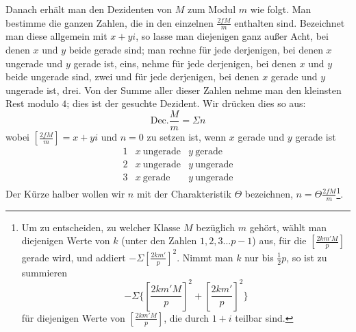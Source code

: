 Danach erhält man den Dezidenten von $M$ zum Modul $m$ wie folgt. Man bestimme die ganzen Zahlen, die in den einzelnen $\frac{2fM}{m}$ enthalten sind. Bezeichnet man diese allgemein mit $x+yi$, so lasse man diejenigen ganz außer Acht, bei denen $x$ und $y$ beide gerade sind; man rechne für jede derjenigen, bei denen $x$ ungerade und $y$ gerade ist, eins, nehme für jede derjenigen, bei denen $x$ und $y$ beide ungerade sind, zwei und für jede derjenigen, bei denen $x$ gerade und $y$ ungerade ist, drei. Von der Summe aller dieser Zahlen nehme man den kleinsten Rest modulo $4$; dies ist der gesuchte Dezident. Wir drücken dies so aus:
\[
\mathrm{Dec.}\frac{M}{m}=\Sigma n
\]
wobei $[\frac{2fM}{m}]=x+yi$ und $n=0$ zu setzen ist, wenn $x$ gerade und $y$ gerade ist
\[
\begin{array}{cll}
1&x\ \text{ungerade}&y\ \text{gerade}\\
2&x\ \text{ungerade}&y\ \text{ungerade}\\
3&x\ \text{gerade}&y\ \text{ungerade}
\end{array}
\]
Der Kürze halber wollen wir $n$ mit der Charakteristik $\Theta$ bezeichnen, \mbox{$n=\Theta\frac{2fM}{m}$}\begingroup\renewcommand{\thefootnote}{*)}\footnote{Um zu entscheiden, zu welcher Klasse $M$ bezüglich $m$ gehört, wählt man diejenigen Werte von $k$ (unter den Zahlen $1,2,3\ldots p-1$) aus, für die $[\frac{2km'M}{p}]$ gerade wird, und addiert $-\Sigma[\frac{2km'}{p}]^2$. Nimmt man $k$ nur bis $\frac12p$, so ist zu summieren
\[
-\Sigma\{[\frac{2km'M}{p}]^2+[\frac{2km'}{p}]^2\}
\]
für diejenigen Werte von $[\frac{2km'M}{p}]$, die durch $1+i$ teilbar sind.}\endgroup.
